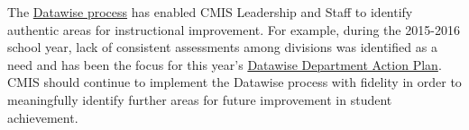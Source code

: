 \begin{findings}
The \href{https://drive.google.com/a/cmis.ac.th/file/d/0B71_pYxcTLo-OExlV0Y5UVFBNVU/view?usp=sharing}{Datawise process} has enabled CMIS Leadership and Staff to identify authentic areas for instructional improvement. For example, during the 2015-2016 school year, lack of consistent assessments among divisions was identified as a need and has been the focus for this year’s \href{https://docs.google.com/a/cmis.ac.th/document/d/1ioGkUkxTr5hRC_Vn4TDy7FcKHwcaWzBYNEeIConfXA4/edit?usp=sharing}{Datawise Department Action Plan}. CMIS should continue to implement the Datawise process with fidelity in order to meaningfully identify further areas for future improvement in student achievement.
\end{findings}
